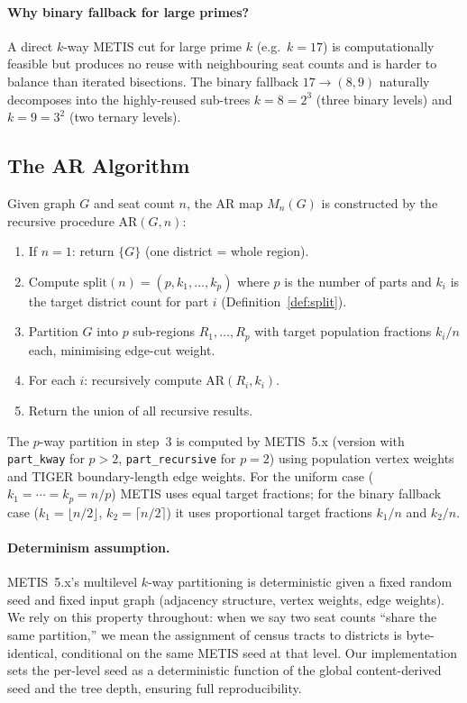 \paragraph{Why binary fallback for large primes?} A direct $k$-way METIS
cut for large prime $k$ (e.g.\ $k=17$) is computationally feasible but
produces no reuse with neighbouring seat counts and is harder to balance than
iterated bisections. The binary fallback $17 \to (8, 9)$ naturally decomposes
into the highly-reused sub-trees $k=8=2^3$ (three binary levels) and $k=9=3^2$
(two ternary levels).

\subsection{The AR Algorithm}
\label{sec:pfr}

\begin{definition}[ApportionRegions]
  Given graph $G$ and seat count $n$, the AR map $M_n(G)$ is constructed by
  the recursive procedure $\text{AR}(G, n)$:
  \begin{enumerate}
    \item If $n = 1$: return $\{G\}$ (one district = whole region).
    \item Compute $\text{split}(n) = (p, k_1, \ldots, k_p)$ where $p$ is the
          number of parts and $k_i$ is the target district count for part $i$
          (Definition~\ref{def:split}).
    \item Partition $G$ into $p$ sub-regions $R_1, \ldots, R_p$ with target
          population fractions $k_i / n$ each, minimising edge-cut weight.
    \item For each $i$: recursively compute $\text{AR}(R_i, k_i)$.
    \item Return the union of all recursive results.
  \end{enumerate}
\end{definition}

The $p$-way partition in step~3 is computed by METIS~5.x (version with
\texttt{part\_kway} for $p > 2$, \texttt{part\_recursive} for $p = 2$) using
population vertex weights and TIGER boundary-length edge weights. For the
uniform case ($k_1 = \cdots = k_p = n/p$) METIS uses equal target fractions;
for the binary fallback case ($k_1 = \lfloor n/2 \rfloor$, $k_2 = \lceil n/2
\rceil$) it uses proportional target fractions $k_1/n$ and $k_2/n$.

\paragraph{Determinism assumption.}
METIS~5.x's multilevel $k$-way partitioning is deterministic given a fixed
random seed and fixed input graph (adjacency structure, vertex weights, edge
weights). We rely on this property throughout: when we say two seat counts
``share the same partition,'' we mean the assignment of census tracts to
districts is byte-identical, conditional on the same METIS seed at that level.
Our implementation sets the per-level seed as a deterministic function of the
global content-derived seed and the tree depth, ensuring full reproducibility.

